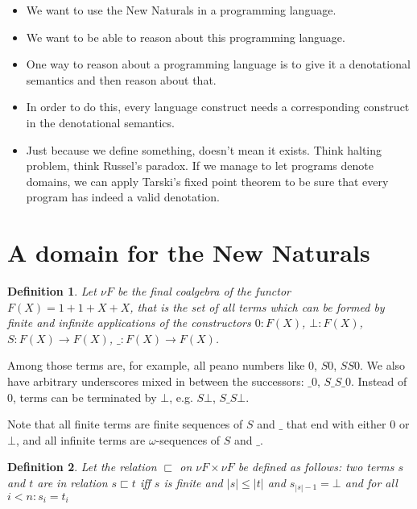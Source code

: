 \documentclass[a4paper]{article}
\newcommand{\arr}{\rightarrow}
\newtheorem{defNuF}{Definition}[section]
\newtheorem{defStrictOrderNuF}[defNuF]{Definition}
\begin{document}
\begin{itemize}

\item We want to use the New Naturals in a programming language.

\item We want to be able to reason about this programming language.

\item One way to reason about a programming language is to give it a
denotational semantics and then reason about that.

\item In order to do this, every language construct needs a corresponding
construct in the denotational semantics.

\item Just because we define something, doesn't mean it exists.  Think halting
problem, think Russel's paradox. If we manage to let programs denote domains,
we can apply Tarski's fixed point theorem to be sure that every program has
indeed a valid denotation.

\end{itemize}

\section{A domain for the New Naturals}

\begin{defNuF}

Let $\nu F$ be the final coalgebra of the functor $F(X) = 1 + 1 + X + X$, that
is the set of all terms which can be formed by finite and infinite applications
of the constructors $0:F(X)$, $\bot:F(X)$, $S:F(X) \arr F(X)$, $\_:F(X) \arr
F(X)$.

\end{defNuF}


Among those terms are, for example, all peano numbers like $0$, $S0$, $SS0$.
We also have arbitrary underscores mixed in between the successors: $\_0$,
$S\_S\_0$.  Instead of $0$, terms can be terminated by $\bot$, e.g.  $S\bot$,
$S\_S\bot$.

Note that all finite terms are finite sequences of $S$ and $\_$
that end with either $0$ or $\bot$, and all infinite terms are
$\omega$-sequences of $S$ and $\_$.



\begin{defStrictOrderNuF}

Let the relation $\sqsubset$ on $\nu F \times \nu F$ be defined as follows: two
terms $s$ and $t$ are in relation $s \sqsubset t$ iff $s$ is finite and $|s|
\leq |t|$ and $s_{|s|-1} = \bot$ and for all $i < n: s_i = t_i$

\end{defStrictOrderNuF}
\end{document}
